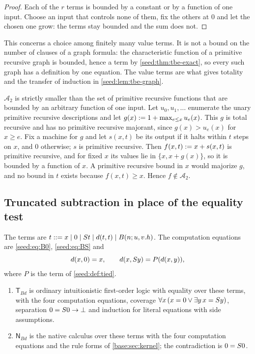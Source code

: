 \begin{proof}
Each of the $r$ terms is bounded by a constant or by a function of one
input. Choose an input that controls none of them, fix the others at $0$ and
let the chosen one grow: the terms stay bounded and the sum does not.
\end{proof}

This concerns a choice among finitely many value terms. It is not a bound on
the number of clauses of a graph formula: the characteristic function of a
primitive recursive graph is bounded, hence a term by
\cref{seed:thm:tbe-exact}, so every such graph has a definition by one
equation. The value terms are what gives totality and the transfer of
induction in \cref{seed:lem:tbe-graph}.

\begin{example}
\label{seed:ex:tbe-majorant}
$\mathcal A_2$ is strictly smaller than the set of primitive recursive
functions that are bounded by an arbitrary function of one input. Let
$u_0,u_1,\ldots$ enumerate the unary primitive recursive descriptions and
let $g(x)\mathrel{:=}1+\max_{e\leq x}u_e(x)$. This $g$ is total recursive and has
no primitive recursive majorant, since $g(x)>u_e(x)$ for $x\geq e$. Fix a
machine for $g$ and let $s(x,t)$ be its output if it halts within $t$ steps
on $x$, and $0$ otherwise; $s$ is primitive recursive. Then
$f(x,t)\mathrel{:=} x+s(x,t)$ is primitive recursive, and for fixed $x$ its values
lie in $\{x,x+g(x)\}$, so it is bounded by a function of $x$. A primitive
recursive bound in $x$ would majorize $g$, and no bound in $t$ exists because
$f(x,t)\geq x$. Hence $f\notin\mathcal A_2$.
\end{example}

\subsection{Truncated subtraction in place of the equality test}

\begin{definition}\label{seed:def:tbd}
The terms are
$t\mathrel{::=}x\mid0\mid S t\mid d(t,t)\mid B(n;u,v.h)$. The computation
equations are \eqref{seed:eq:B0}, \eqref{seed:eq:BS} and
\begin{equation}\label{seed:eq:monus}
 d(x,0)=x,\qquad d(x,S y)=P(d(x,y)),
\end{equation}
where $P$ is the term of \cref{seed:def:tied}.
\begin{enumerate}[label=(\alph*),nosep]
\item $\mathsf{T}_{Bd}$ is ordinary intuitionistic first-order logic with
equality over these terms, with the four computation equations, coverage
$\forall x\,(x=0\lor\exists y\,x=S y)$, separation $0=S 0\to\bot$ and
induction for literal equations with side assumptions.
\item $\mathsf{N}_{Bd}$ is the native calculus over these terms with the
four computation equations and the rule forms of \cref{base:sec:kernel};
the contradiction is $0=S 0$.
\end{enumerate}
\end{definition}

